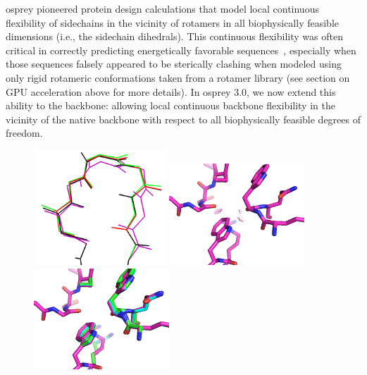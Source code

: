 {\sc osprey} pioneered protein design calculations that model local continuous flexibility of sidechains in the vicinity of rotamers in all biophysically feasible dimensions (i.e., the sidechain dihedrals).  This continuous flexibility was often critical in correctly predicting energetically favorable sequences~\cite{iMinDEE,OSPREY_MIE}, especially when those sequences falsely appeared to be sterically clashing when modeled using only rigid rotameric conformations taken from a rotamer library (see section on GPU acceleration above for more details).  In {\sc osprey} 3.0, we now extend this ability to the backbone: allowing local continuous backbone flexibility in the vicinity of the native backbone with respect to all biophysically feasible degrees of freedom.  

\begin{figure}
\includegraphics[width=2in,height=1.7in]{figures/cats_confs.png}\hspace{0.2in}\includegraphics[width=2in,height=1.5in]{figures/w54_rigidBB_clashes.png}\hspace{0.2in}\includegraphics[width=2in,height=1.5in]{figures/w54_overlay.png}

\end{figure}
